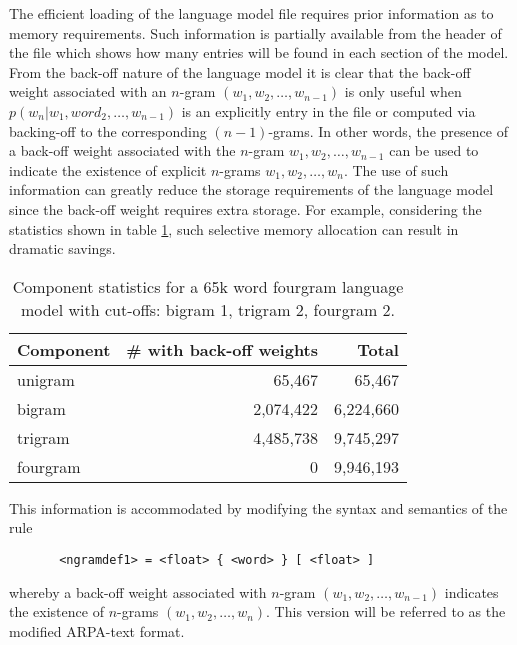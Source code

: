 The efficient loading of the language model file requires prior
information as to memory requirements. Such information is partially
available from the header of the file which shows how many entries
will be found in each section of the model. From the back-off nature
of the language model it is clear that the back-off weight associated
with an $n$-gram $(w_1, w_2, \ldots, w_{n-1})$ is only useful when
$p(w_n | w_1, word_2, \ldots, w_{n-1})$ is an explicitly entry in the
file or computed via backing-off to the corresponding
$(n-1)$-grams. In other words, the presence of a back-off weight
associated with the $n$-gram $w_1, w_2, \ldots, w_{n-1}$ can be used
to indicate the existence of explicit $n$-grams $w_1, w_2, \ldots,
w_n$. The use of such information can greatly reduce the storage
requirements of the language model since the back-off weight requires
extra storage. For example, considering the statistics shown in table
\ref{fg_stats}, such selective memory allocation can result in dramatic 
savings.
\begin{table}
  \center
  \begin{tabular}{|l|r|r|} \hline
	{Component} & {\# with back-off weights} & {Total}       \\ \hline
	{unigram}   & 65,467       & 65,467        \\ \hline
	{bigram}    & 2,074,422    & 6,224,660     \\ \hline
        {trigram}   & 4,485,738    & 9,745,297     \\ \hline
        {fourgram}  & 0            & 9,946,193     \\ \hline
  \end{tabular}
  \caption{Component statistics for a 65k word fourgram language model with 
  cut-offs: bigram 1, trigram 2, fourgram 2.} 
  \label{fg_stats}
\end{table} 
This information is accommodated by modifying the syntax and semantics
of the rule
\begin{verbatim}
       <ngramdef1> = <float> { <word> } [ <float> ]
\end{verbatim}
whereby a back-off weight associated with $n$-gram $(w_1, w_2,\ldots,
w_{n-1})$ indicates the existence of $n$-grams $(w_1, w_2, \ldots,
w_n)$. This version will be referred to as the modified ARPA-text
format.
  
